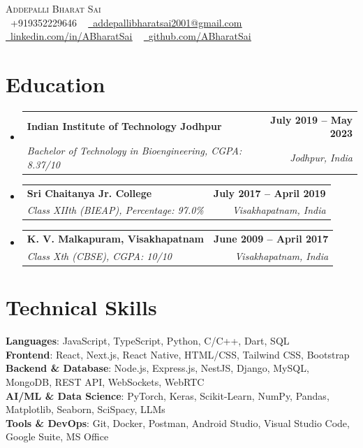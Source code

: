 \documentclass[letterpaper,10pt]{article}
\makeatletter
\let\orighref\href
\renewcommand{\href}[2]{\orighref{#1}{#2\,{\mdseries\faExternalLink}}}
\newcommand{\resumeSubheading}[4]{
  \vspace{2pt}\item
    \begin{tabular*}{1.0\textwidth}[t]{l@{\extracolsep{\fill}}r}
      \textbf{#1} & \textbf{\small #2} \\
      \textit{\small#3} & \textit{\small #4} \\
    \end{tabular*}
}
\newcommand{\resumeSubHeadingListStart}{\begin{itemize}[leftmargin=0.0in, itemsep=0pt, label={}]}
\newcommand{\resumeSubHeadingListEnd}{\end{itemize}}
\makeatother
\begin{document}
\begin{center}
    {\huge \scshape Addepalli Bharat Sai} \\ \vspace{2pt}
    \small \raisebox{-0.1\height}\faPhone\ +919352229646 ~ \orighref{mailto:addepallibharatsai2001@gmail.com}{\raisebox{-0.2\height}\faEnvelope\  \underline{addepallibharatsai2001@gmail.com}} ~ 
    \orighref{https://linkedin.com/in/addepalli-bharat-sai-89b376193}{\raisebox{-0.2\height}\faLinkedin\ \underline{linkedin.com/in/ABharatSai}}  ~
    \orighref{https://github.com/ABharatSai}{\raisebox{-0.2\height}\faGithub\ \underline{github.com/ABharatSai}}
\end{center}

\section{Education}
  \resumeSubHeadingListStart
 \resumeSubheading
      {Indian Institute of Technology Jodhpur}{July 2019 -- May 2023}
      {Bachelor of Technology in Bioengineering, CGPA: 8.37/10} {Jodhpur, India}
 \resumeSubheading
      {Sri Chaitanya Jr. College}{July 2017 -- April 2019}
      {Class XIIth (BIEAP), Percentage: 97.0\%} {Visakhapatnam, India}
 \resumeSubheading
      {K. V. Malkapuram, Visakhapatnam}{June 2009 -- April 2017}
      {Class Xth (CBSE), CGPA: 10/10} {Visakhapatnam, India}
  \resumeSubHeadingListEnd

\section{Technical Skills}
\begin{itemize}[leftmargin=0.15in, label={}]
\small{\item{
\textbf{Languages}{: JavaScript, TypeScript, Python, C/C++, Dart, SQL} \\
\vspace{1pt}
\textbf{Frontend}{: React, Next.js, React Native, HTML/CSS, Tailwind CSS, Bootstrap} \\
\vspace{1pt}
\textbf{Backend \& Database}{: Node.js, Express.js, NestJS, Django, MySQL, MongoDB, REST API, WebSockets, WebRTC} \\
\vspace{1pt}
\textbf{AI/ML \& Data Science}{: PyTorch, Keras, Scikit-Learn, NumPy, Pandas, Matplotlib, Seaborn, SciSpacy, LLMs} \\
\vspace{1pt}
\textbf{Tools \& DevOps}{: Git, Docker, Postman, Android Studio, Visual Studio Code, Google Suite, MS Office}
}}
\end{itemize}
\end{document}
